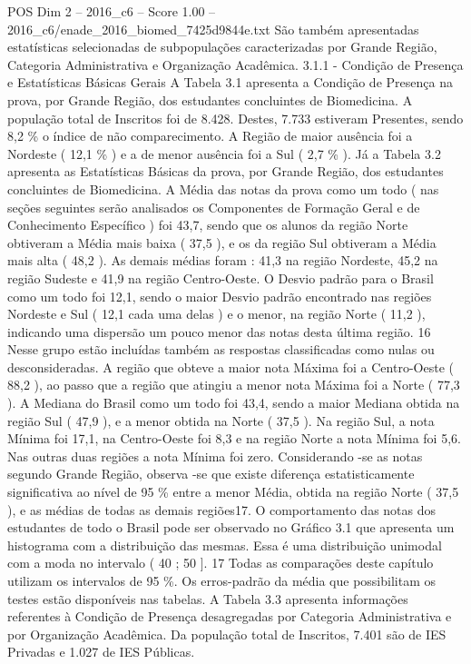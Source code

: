 \begin{textsample}{POS Dim 2 – 2016\_c6 – Score 1.00 – 2016\_c6/enade\_2016\_biomed\_7425d9844e.txt}
São também apresentadas estatísticas selecionadas de subpopulações caracterizadas por Grande Região, Categoria Administrativa e Organização Acadêmica. 3.1.1 - Condição de Presença e Estatísticas Básicas Gerais A Tabela 3.1 apresenta a Condição de Presença na prova, por Grande Região, dos estudantes concluintes de Biomedicina.
A população total de Inscritos foi de 8.428.
Destes, 7.733 estiveram Presentes, sendo 8,2 \% o índice de não comparecimento.
A Região de maior ausência foi a Nordeste ( 12,1 \% ) e a de menor ausência foi a Sul ( 2,7 \% ).
Já a Tabela 3.2 apresenta as Estatísticas Básicas da prova, por Grande Região, dos estudantes concluintes de Biomedicina.
A Média das notas da prova como um todo ( nas seções seguintes serão analisados os Componentes de Formação Geral e de Conhecimento Específico ) foi 43,7, sendo que os alunos da região Norte obtiveram a Média mais baixa ( 37,5 ), e os da região Sul obtiveram a Média mais alta ( 48,2 ).
As demais médias foram : 41,3 na região Nordeste, 45,2 na região Sudeste e 41,9 na região Centro-Oeste.
O Desvio padrão para o Brasil como um todo foi 12,1, sendo o maior Desvio padrão encontrado nas regiões Nordeste e Sul ( 12,1 cada uma delas ) e o menor, na região Norte ( 11,2 ), indicando uma dispersão um pouco menor das notas desta última região. 16 Nesse grupo estão incluídas também as respostas classificadas como nulas ou desconsideradas.
A região que obteve a maior nota Máxima foi a Centro-Oeste ( 88,2 ), ao passo que a região que atingiu a menor nota Máxima foi a Norte ( 77,3 ).
A Mediana do Brasil como um todo foi 43,4, sendo a maior Mediana obtida na região Sul ( 47,9 ), e a menor obtida na Norte ( 37,5 ).
Na região Sul, a nota Mínima foi 17,1, na Centro-Oeste foi 8,3 e na região Norte a nota Mínima foi 5,6.
Nas outras duas regiões a nota Mínima foi zero.
Considerando -se as notas segundo Grande Região, observa -se que existe diferença estatisticamente significativa ao nível de 95 \% entre a menor Média, obtida na região Norte ( 37,5 ), e as médias de todas as demais regiões17.
O comportamento das notas dos estudantes de todo o Brasil pode ser observado no Gráfico 3.1 que apresenta um histograma com a distribuição das mesmas.
Essa é uma distribuição unimodal com a moda no intervalo ( 40 ; 50 ]. 17 Todas as comparações deste capítulo utilizam os intervalos de 95 \%.
Os erros-padrão da média que possibilitam os testes estão disponíveis nas tabelas.
A Tabela 3.3 apresenta informações referentes à Condição de Presença desagregadas por Categoria Administrativa e por Organização Acadêmica.
Da população total de Inscritos, 7.401 são de IES Privadas e 1.027 de IES Públicas.

\end{textsample}
